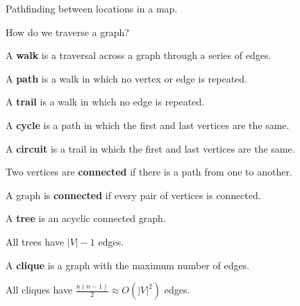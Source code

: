 \documentclass[a4paper]{article}
\begin{document}
\begin{eg}
	Pathfinding between locations in a map.
\end{eg}

How do we traverse a graph?

\begin{definition}
	A \textbf{walk} is a traversal across a graph through a series of edges.
\end{definition}

\begin{definition}
	A \textbf{path} is a walk in which no vertex or edge is repeated.
\end{definition}

\begin{definition}
	A \textbf{trail} is a walk in which no edge is repeated.
\end{definition}

\begin{definition}
	A \textbf{cycle} is a path in which the first and last vertices are the same.
\end{definition}

\begin{definition}
	A \textbf{circuit} is a trail in which the first and last vertices are the same.
\end{definition}

\begin{definition}
	Two vertices are \textbf{connected} if there is a path from one to another.
\end{definition}

\begin{definition}
	A graph is \textbf{connected} if every pair of vertices is connected.
\end{definition}

\begin{definition}
	A \textbf{tree} is an acyclic connected graph.
\end{definition}

\begin{note}
	All trees have \( |V|-1 \) edges.
\end{note}

\begin{definition}
	A \textbf{clique} is a graph with the maximum number of edges.
\end{definition}

\begin{note}
	All cliques have \( \frac{n(n-1)}{2} \approx O(|V|^2)\) edges.
\end{note}
\end{document}
